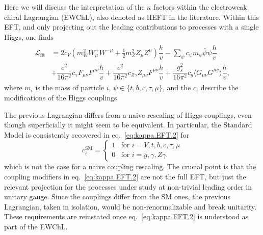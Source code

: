 Here we will discuss the interpretation of the $\kappa$ factors within the electroweak chiral Lagrangian (EWChL), also denoted as HEFT in the literature. Within this EFT, and only projecting out the leading contributions to processes with a single Higgs, one finds\cite{Buchalla:2015qju,Buchalla:2015wfa,deBlas:2018tjm}
\begin{align}
  \begin{aligned}
    \label{eq:kappa.EFT.2}
    \mathcal{L}_{\text{fit}} &= 2 c_{V} \left(m_{W}^{2}W_{\mu}^{+}W^{-\mu} +\tfrac{1}{2} m^2_Z Z_{\mu}Z^{\mu}\right) \dfrac{h}{v} - \sum_{\psi}c_{\psi} m_{\psi} \bar{\psi} \psi \dfrac{h}{v} \\
 &+ \dfrac{e^{2}}{16\pi^{2}} c_{\gamma} F_{\mu\nu}F^{\mu\nu} \dfrac{h}{v}+ \dfrac{e^{2}}{16\pi^{2}} c_{Z\gamma} Z_{\mu\nu}F^{\mu\nu} \dfrac{h}{v}+\dfrac{g_{s}^{2}}{16\pi^{2}} c_{g}\langle G_{\mu\nu}G^{\mu\nu}\rangle\dfrac{h}{v},
  \end{aligned}
\end{align}
where $m_{i}$ is the mass of particle $i$, $\psi \in \{t, b, c, \tau, \mu\}$, and the $c_{i}$ describe the modifications of the Higgs couplings.

The previous Lagrangian differs from a naive rescaling of Higgs couplings, even though superficially it might seem to be equivalent. In particular, the Standard Model is consistently recovered in eq.~\eqref{eq:kappa.EFT.2} for
\begin{equation}
  \label{eq:kappa.EFT.3}
    c_{i}^{\text{SM}} = \begin{cases} 1 & \text{for } i = V, t, b, c, \tau, \mu\\ 0 & \text{for } i = g, \gamma, Z\gamma. \end{cases}
\end{equation} 
which is not the case for a naive coupling rescaling. The crucial point is that the coupling modifiers in eq.~\eqref{eq:kappa.EFT.2} are not the full EFT, but just the relevant projection for the processes under study at non-trivial leading order in unitary gauge. Since the couplings differ from the SM ones, the previous Lagrangian, taken in isolation, would be non-renormalizable and break unitarity. These requirements are reinstated once eq.~\eqref{eq:kappa.EFT.2} is understood as part of the EWChL.
 
